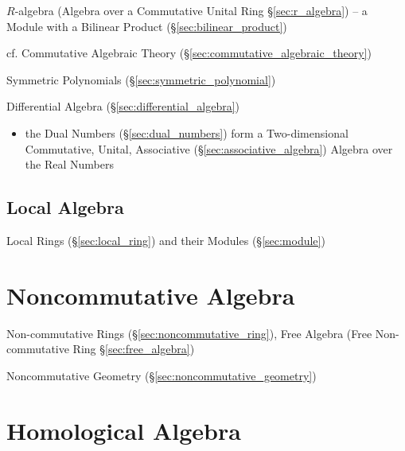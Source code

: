 \fist $R$-algebra (Algebra over a Commutative Unital Ring \S\ref{sec:r_algebra})
-- a Module with a Bilinear Product (\S\ref{sec:bilinear_product})

\fist cf. Commutative Algebraic Theory
(\S\ref{sec:commutative_algebraic_theory})

\fist Symmetric Polynomials (\S\ref{sec:symmetric_polynomial})

\fist Differential Algebra (\S\ref{sec:differential_algebra})

\begin{itemize}
  \item the Dual Numbers (\S\ref{sec:dual_numbers}) form a Two-dimensional
    Commutative, Unital, Associative (\S\ref{sec:associative_algebra}) Algebra
    over the Real Numbers
\end{itemize}



\subsection{Local Algebra}\label{sec:local_algebra}

Local Rings (\S\ref{sec:local_ring}) and their Modules (\S\ref{sec:module})



\section{Noncommutative Algebra}\label{sec:noncommutative_algebra}

Non-commutative Rings (\S\ref{sec:noncommutative_ring}),
Free Algebra (Free Non-commutative Ring \S\ref{sec:free_algebra})

Noncommutative Geometry (\S\ref{sec:noncommutative_geometry})



\section{Homological Algebra}\label{sec:homological_algebra}

